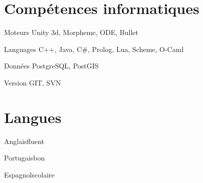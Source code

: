 \documentclass{tccv}
\begin{document}
\section{Comp\'{e}tences informatiques}

\begin{factlist}

\item{Moteurs}
     {Unity 3d, Morpheme, ODE, Bullet}
	 
\item{Languages}
     {C++, Java, C\#, Prolog, Lua, Scheme, O-Caml}
	 
\item{Donn\'{e}es}
     {PostgreSQL, PostGIS}

\item{Version}
     {GIT, SVN}

\end{factlist}










\section{Langues}

\begin{factlist}
\item{Anglais}{fluent}
\item{Portugais}{bon}
\item{Espagnol}{scolaire}
\end{factlist}
\end{document}
